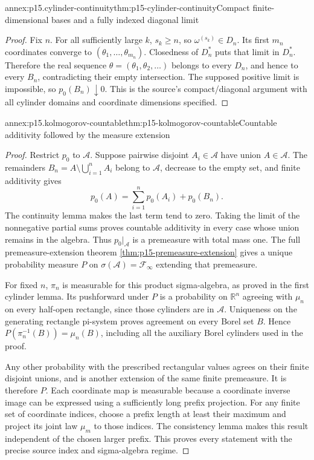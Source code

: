 \begin{annexitem}{annex:p15.cylinder-continuity}{thm:p15-cylinder-continuity}{Compact finite-dimensional bases and a fully indexed diagonal limit}
\begin{proof}
Fix \(n\). For all sufficiently large \(k\), \(s_k\geq n\),
so \(\omega^{(s_k)}\in D_n\). Its first \(m_n\)
coordinates converge to \((\theta_1,\ldots,\theta_{m_n})\).
Closedness of \(D_n^*\) puts that limit in \(D_n^*\).
Therefore the real sequence \(\theta=(\theta_1,\theta_2,\ldots)\)
belongs to every \(D_n\), and hence to every \(B_n\),
contradicting their empty intersection. The supposed positive
limit is impossible, so \(p_0(B_n)\downarrow0\).
This is the source's compact/diagonal argument with all cylinder
domains and coordinate dimensions specified.
\end{proof}
\end{annexitem}

\begin{annexitem}{annex:p15.kolmogorov-countable}{thm:p15-kolmogorov-countable}{Countable additivity followed by the measure extension}
\begin{proof}
Restrict \(p_0\) to \(\mathcal A\). Suppose pairwise disjoint
\(A_i\in\mathcal A\) have union \(A\in\mathcal A\).
The remainders \(B_n=A\setminus\bigcup_{i=1}^n A_i\)
belong to \(\mathcal A\), decrease to the empty set, and
finite additivity gives
\[
 p_0(A)=\sum_{i=1}^n p_0(A_i)+p_0(B_n).
\]
The continuity lemma makes the last term tend to zero. Taking
the limit of the nonnegative partial sums proves countable
additivity in every case whose union remains in the algebra.
Thus \(p_0|_{\mathcal A}\) is a premeasure with total mass
one. The full premeasure-extension theorem
\ref{thm:p15-premeasure-extension} gives a unique probability
measure \(P\) on \(\sigma(\mathcal A)=\mathcal F_\infty\)
extending that premeasure.

For fixed \(n\), \(\pi_n\) is measurable for this product
sigma-algebra, as proved in the first cylinder lemma. Its
pushforward under \(P\) is a probability on \(\mathbb R^n\)
agreeing with \(\mu_n\) on every half-open rectangle, since
those cylinders are in \(\mathcal A\). Uniqueness on the
generating rectangle pi-system proves agreement on every Borel
set \(B\). Hence \(P(\pi_n^{-1}(B))=\mu_n(B)\), including
all the auxiliary Borel cylinders used in the proof.

Any other probability with the prescribed rectangular values
agrees on their finite disjoint unions, and is another extension
of the same finite premeasure. It is therefore \(P\).
Each coordinate map is measurable because a coordinate inverse
image can be expressed using a sufficiently long prefix projection.
For any finite set of coordinate indices, choose a prefix length
at least their maximum and project its joint law \(\mu_m\)
to those indices. The consistency lemma makes this result
independent of the chosen larger prefix. This proves every
statement with the precise source index and sigma-algebra regime.
\end{proof}
\end{annexitem}

